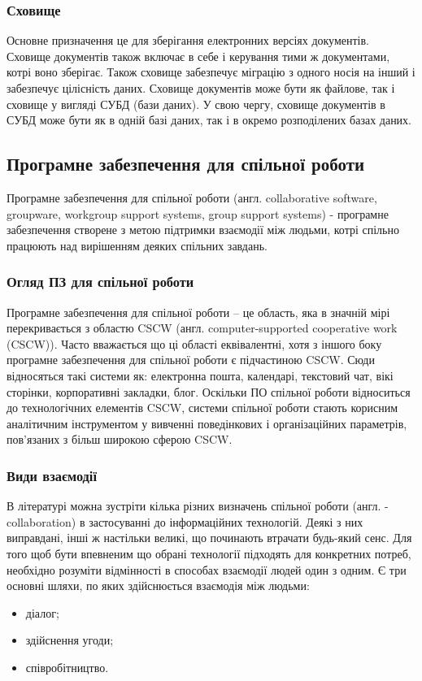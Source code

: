 \subsubsection{Сховище}
Основне призначення це для зберігання електронних версіях документів. 
Сховище документів також включає в себе і керування тими ж документами, котрі воно зберігає.
Також сховище забезпечує міграцію з одного носія на інший і забезпечує цілісність даних.
Сховище документів може бути як файлове, так і сховище у вигляді СУБД (бази даних). 
У свою чергу, сховище документів в СУБД може бути як в одній базі даних, так і в окремо розподілених базах даних.
        

\subsection{Програмне забезпечення для спільної роботи}
Програмне забезпечення для спільної роботи (англ. collaborative software, groupware, workgroup support systems, group support systems) - програмне забезпечення створене з метою підтримки взаємодії між людьми, котрі спільно працюють над вирішенням деяких спільних завдань. 

\subsubsection{Огляд ПЗ для спільної роботи}
Програмне забезпечення для спільної роботи -- це область, яка в значній мірі перекривається з областю CSCW (англ. computer-supported cooperative work (CSCW)).
Часто вважається що ці області еквівалентні, хотя з іншого боку програмне забезпечення для спільної роботи є підчастиною CSCW.
Сюди відносяться такі системи як: електронна пошта, календарі, текстовий чат, вікі сторінки, корпоративні закладки, блог.
Оскільки ПО спільної роботи відноситься до технологічних елементів CSCW, системи спільної роботи стають корисним аналітичним інструментом у вивченні поведінкових і організаційних параметрів, пов'язаних з більш широкою сферою CSCW.

\subsubsection{Види взаємодії}
В літературі можна зустріти кілька різних визначень спільної роботи (англ. - collaboration) в застосуванні до інформаційних технологій. Деякі з них виправдані, інші ж настільки великі, що починають втрачати будь-який сенс.
Для того щоб бути впевненим що обрані технології підходять для конкретних потреб, необхідно розуміти відмінності в способах взаємодії людей один з одним.
Є три основні шляхи, по яких здійснюється взаємодія між людьми: 
\begin{itemize}
\item діалог;
\item здійснення угоди;
\item співробітництво.
\end{itemize}

